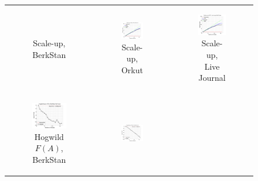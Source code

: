 \documentclass{article} %
\begin{document}
\begin{figure}[ht]
\begin{tabular}{ccc}
\begin{subfigure}[b]{0.31\textwidth}
			\caption{Scale-up, BerkStan}
			\label{fig:scaleup_webberkstan_setcover}
	  \end{subfigure} &
	  \begin{subfigure}[b]{0.31\textwidth}
	  	\includegraphics[width=150pt]{images/scaleup_orkut_setcover.png}
			\caption{Scale-up, Orkut}
			\label{fig:scaleup_orkut_setcover}
	  \end{subfigure} &
	  \begin{subfigure}[b]{0.31\textwidth}
	  	\includegraphics[width=150pt]{images/scaleup_livejournal_setcover.png}
			\caption{Scale-up, Live Journal}
			\label{fig:scaleup_livejournal_setcover}
	  \end{subfigure} \\
	  \begin{subfigure}[b]{0.31\textwidth}
	  	\includegraphics[width=150pt]{images/diffFA_Hogwild_webberkstan_setcover.png}
			\caption{Hogwild $F(A)$, BerkStan}
			\label{fig:diffFA_Hogwild_webberkstan_setcover}
	  \end{subfigure} &
	  \begin{subfigure}[b]{0.31\textwidth}
	  	\includegraphics[width=150pt]{images/diffFA_Hogwild_orkut_setcover.png}

\end{subfigure}
\end{tabular}
\end{figure}
\end{document}
